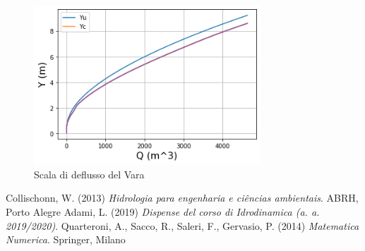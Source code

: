 \documentclass[12pt]{article} %
\begin{document}
\begin{figure} [H]
    \centering
    \includegraphics[width=8.5cm]{deflussova.png}
    \caption{Scala di deflusso del Vara}
    \label{fig:Vara_scala_deflusso}
\end{figure}

\newpage

\begin{thebibliography}{}
Collischonn, W. (2013) \textit{Hidrologia para engenharia e ciências ambientais}. ABRH, Porto Alegre
Adami, L. (2019) \textit{Dispense del corso di Idrodinamica (a. a. 2019/2020)}.
Quarteroni, A., Sacco, R., Saleri, F., Gervasio, P. (2014) \textit{Matematica Numerica}. Springer, Milano
\end{thebibliography}
\end{document}
